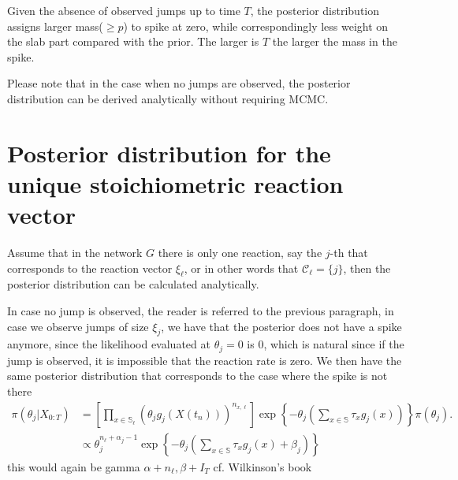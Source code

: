 \documentclass[pdflatex,sn-mathphys-num]{sn-jnl}%
\theoremstyle{thmstyleone}%
\theoremstyle{thmstyletwo}%
\theoremstyle{thmstylethree}%
\begin{document}
\begin{appendices}
Given the absence of observed jumps up to time $T$, the posterior distribution assigns larger mass($\geq p$) to spike at zero, while correspondingly less weight on the slab part compared with the prior. The larger is $T$ the larger the mass in the spike.

Please note that in the case when no jumps are observed, the posterior distribution can be derived analytically without requiring MCMC.


\section{Posterior distribution for the unique stoichiometric reaction vector}
\label{sec:posterior_unique_stoichiometric}


Assume that in the network $G$ there is only one reaction, say the $j$-th that corresponds to the reaction vector $\xi_\ell$, or in other words that $\mathcal C_\ell=\{j\}$, then the posterior distribution can be calculated analytically.

In case no jump is observed, the reader is referred to the previous paragraph, in case we observe jumps of size $\xi_j$, we have that the posterior does not have a spike anymore, since the likelihood evaluated at $\theta_j=0$ is 0, which is natural since if the jump is observed, it is impossible that the reaction rate is zero. We then have the same posterior distribution that corresponds to the case where the spike is not there
\begin{equation}
\begin{aligned}
\pi(\theta_j| X_{0:T}) 
    &=\left[   \prod_{x \in \mathbb{S}_\ell}\left(\theta_{j}
   g_{j}\left( X(t_n)\right) \right)^{n_{x, \ell} } \right] 
    \exp\left\{- \theta_{j} \left(   \sum_{x \in \mathbb{S}} \tau_{x}  g_{j}(x)  \right)
    \right\} \pi(\theta_j) .\\
    &\propto  \theta_{j}^{n_\ell+\alpha_j-1} 
    \exp\left\{- \theta_{j} \left(   \sum_{x \in \mathbb{S}} \tau_{x}  g_{j}(x) +\beta_j \right)
    \right\} 
\end{aligned}
\end{equation}
this would again be gamma $\alpha + n_\ell, \beta + I_T$
cf. Wilkinson's book \cite{Wilkinson2018}


\end{appendices}
\end{document}
